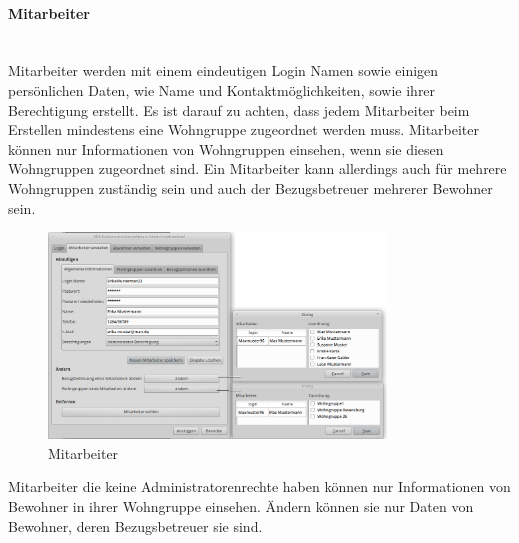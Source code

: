 \paragraph{Mitarbeiter}\mbox{}\\
Mitarbeiter werden mit einem eindeutigen Login Namen sowie einigen persönlichen Daten, wie Name und Kontaktmöglichkeiten, sowie ihrer Berechtigung
erstellt. Es ist darauf zu achten, dass jedem Mitarbeiter beim Erstellen mindestens eine Wohngruppe zugeordnet werden muss. Mitarbeiter können nur
Informationen von Wohngruppen einsehen, wenn sie diesen Wohngruppen zugeordnet sind. Ein Mitarbeiter kann allerdings auch für mehrere
Wohngruppen zuständig sein und auch der Bezugsbetreuer mehrerer Bewohner sein.
\begin{figure}[h]
	\begin{center}
		\includegraphics[keepaspectratio=true, width=0.8\textwidth]{pics/admin1.png}
		\caption{Mitarbeiter}
		\label{Admindialog Mitarbeiter}
	\end{center}
\end{figure}
\FloatBarrier
\noindent
Mitarbeiter die keine Administratorenrechte haben können nur Informationen von Bewohner in ihrer Wohngruppe einsehen. Ändern können sie nur Daten von
Bewohner, deren Bezugsbetreuer sie sind.
\newpage
